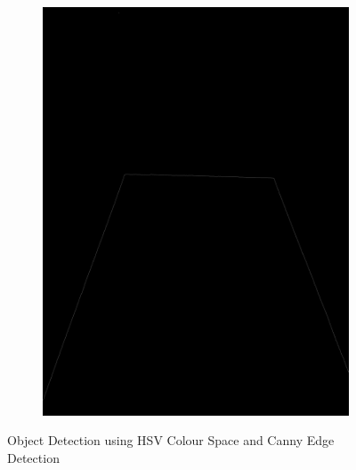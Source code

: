 \documentclass[a4paper,12pt]{article}
\begin{document}
\begin{appendices}
\begin{figure}[H]
\begin{subfigure}{.5\textwidth}
			\includegraphics[width=.98\textwidth]{1-1}
		\end{subfigure}
	\caption{\label{green}Object Detection using HSV Colour Space and Canny Edge Detection   }
	\end{figure}
\begin{figure}[H]
	\centering
	\begin{subfigure}{.5\textwidth}
		\centering

\end{subfigure}
\end{figure}
\end{appendices}
\end{document}

